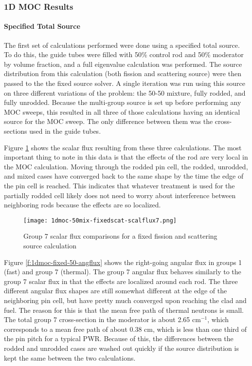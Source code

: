 \subsubsection{1D MOC Results}

\paragraph{Specified Total Source}

The first set of calculations performed were done using a specified total source.  To do this, the guide tubes were filled with 50\% control rod and 50\% moderator by volume fraction, and a full eigenvalue calculation was performed.  The source distribution from this calculation (both fission and scattering source) were then passed to the the fixed source solver.  A single iteration was run using this source on three different variations of the problem: the 50-50 mixture, fully rodded, and fully unrodded.  Because the multi-group source is set up before performing any MOC sweeps, this resulted in all three of those calculations having an identical source for the MOC sweep.  The only difference between them was the cross-sections used in the guide tubes.

Figure \ref{f:1dmoc-fixed-50-scalflux7} shows the scalar flux resulting from these three calculations.  The most important thing to note in this data is that the effects of the rod are very local in the MOC calculation.  Moving through the rodded pin cell, the rodded, unrodded, and mixed cases have converged back to the same shape by the time the edge of the pin cell is reached.  This indicates that whatever treatment is used for the partially rodded cell likely does not need to worry about interference between neighboring rods because the effects are so localized.

\begin{figure}[H]
    \centering
    \texttt{[image: 1dmoc-50mix-fixedscat-scalflux7.png]}
    \caption{Group 7 scalar flux comparisons for a fixed fission and scattering source calculation}\label{f:1dmoc-fixed-50-scalflux7}
\end{figure}

Figure \ref{f:1dmoc-fixed-50-angflux} shows the right-going angular flux in groups 1 (fast) and group 7 (thermal).  The group 7 angular flux behaves similarly to the group 7 scalar flux in that the effects are localized around each rod.  The three different angular flux shapes are still somewhat different at the edge of the neighboring pin cell, but have pretty much converged upon reaching the clad and fuel.  The reason for this is that the mean free path of thermal neutrons is small.  The total group 7 cross-section in the moderator is about 2.65 cm$^{-1}$, which corresponds to a mean free path of about 0.38 cm, which is less than one third of the pin pitch for a typical PWR.  Because of this, the differences between the rodded and unrodded cases are washed out quickly if the source distribution is kept the same between the two calculations.

